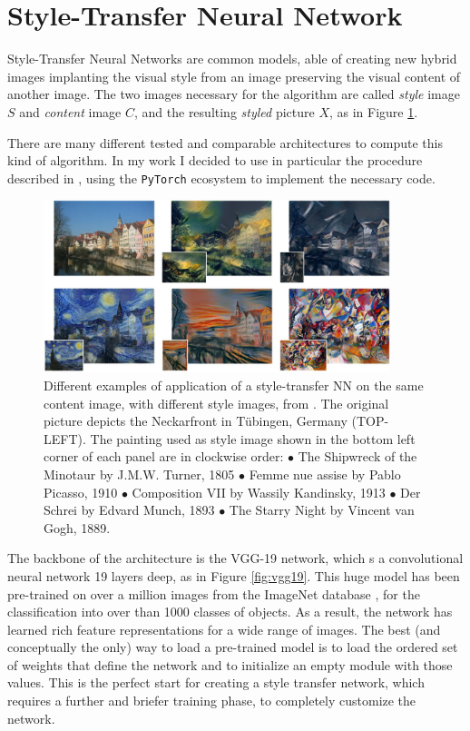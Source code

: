 \documentclass[12pt,a4paper]{report}
\begin{document}

\section{Style-Transfer Neural Network} \label{ssec:sttrNN}
    Style-Transfer Neural Networks are common models, able of creating new hybrid images implanting the visual style from an image preserving the visual content of another image. The two images necessary for the algorithm are called \textit{style} image $S$ and \textit{content} image $C$, and the resulting \textit{styled} picture $X$, as in Figure \ref{fig:ex_st_tr}.

    There are many different tested and comparable architectures to compute this kind of algorithm. In my work I decided to use in particular the procedure described in \cite{1508.06576}, using the \texttt{PyTorch} ecosystem to implement the necessary code.

    \begin{figure}
        \centering
        \includegraphics[width = 0.9\textwidth]{images/st_trasf_ex}
        \caption{Different examples of application of a style-transfer NN on the same content image, with different style images, from \cite{1508.06576}. The
    original picture depicts the Neckarfront in Tübingen, Germany (TOP-LEFT). The painting used as style image shown in the bottom left corner of each panel are in clockwise order: $\bullet$ The Shipwreck of the Minotaur by J.M.W. Turner, 1805 $\bullet$ Femme nue assise by Pablo Picasso, 1910 $\bullet$ Composition VII by Wassily Kandinsky, 1913 $\bullet$ Der Schrei by Edvard Munch, 1893 $\bullet$ The Starry Night by Vincent van Gogh, 1889.}
        \label{fig:ex_st_tr}
    \end{figure}

    The backbone of the architecture is the VGG-19 network, which s a convolutional neural network 19 layers deep, as in Figure \ref{fig:vgg19}. This huge model has been pre-trained on over a million images from the ImageNet database \cite{imagenet_cvpr09}, for the classification into over than 1000 classes of objects. As a result, the network has learned rich feature representations for a wide range of images. The best (and conceptually the only) way to load a pre-trained model is to load the ordered set of weights that define the network and to initialize an empty module with those values. This is the perfect start for creating a style transfer network, which requires a further and briefer training phase, to completely customize the network.
\end{document}
